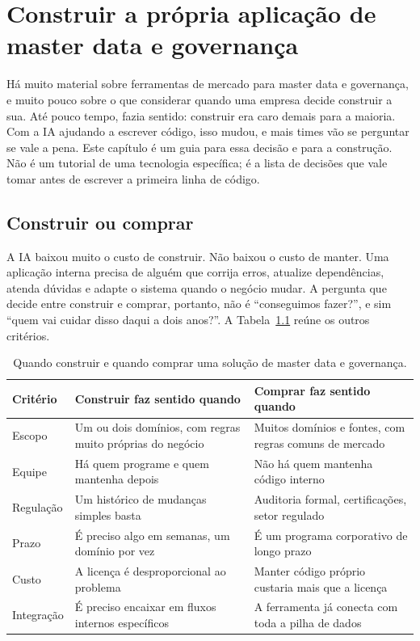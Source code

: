 \chapter{Construir a própria aplicação de master data e governança}
\label{cap:aplicacao-propria}

Há muito material sobre ferramentas de mercado para master data e governança, e muito
pouco sobre o que considerar quando uma empresa decide construir a sua. Até pouco tempo,
fazia sentido: construir era caro demais para a maioria. Com a IA ajudando a escrever
código, isso mudou, e mais times vão se perguntar se vale a pena. Este capítulo é um guia
para essa decisão e para a construção. Não é um tutorial de uma tecnologia específica; é a
lista de decisões que vale tomar antes de escrever a primeira linha de código.

\section{Construir ou comprar}
\label{sec:construir-comprar}

A IA baixou muito o custo de construir. Não baixou o custo de manter. Uma aplicação interna
precisa de alguém que corrija erros, atualize dependências, atenda dúvidas e adapte o
sistema quando o negócio mudar. A pergunta que decide entre construir e comprar, portanto,
não é \enquote{conseguimos fazer?}, e sim \enquote{quem vai cuidar disso daqui a dois
anos?}. A Tabela~\ref{tab:construir-comprar} reúne os outros critérios.

\begin{table}[htbp]
  \centering
  \caption{Quando construir e quando comprar uma solução de master data e governança.}
  \label{tab:construir-comprar}
  \small
  \begin{tabularx}{\textwidth}{@{}>{\raggedright\arraybackslash}p{}
      >{\raggedright\arraybackslash}X>{\raggedright\arraybackslash}X@{}}
    \toprule
    Critério & Construir faz sentido quando & Comprar faz sentido quando \\
    \midrule
    Escopo & Um ou dois domínios, com regras muito próprias do negócio & Muitos domínios e fontes, com regras comuns de mercado \\
    \addlinespace
    Equipe & Há quem programe e quem mantenha depois & Não há quem mantenha código interno \\
    \addlinespace
    Regulação & Um histórico de mudanças simples basta & Auditoria formal, certificações, setor regulado \\
    \addlinespace
    Prazo & É preciso algo em semanas, um domínio por vez & É um programa corporativo de longo prazo \\
    \addlinespace
    Custo & A licença é desproporcional ao problema & Manter código próprio custaria mais que a licença \\
    \addlinespace
    Integração & É preciso encaixar em fluxos internos específicos & A ferramenta já conecta com toda a pilha de dados \\
    \bottomrule
  \end{tabularx}
\end{table}

